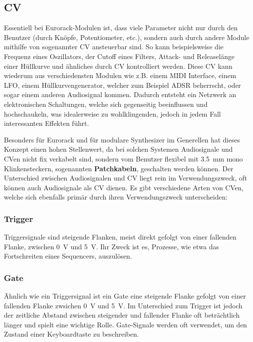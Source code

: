 \subsection{\acf{CV} \label{CV}}
\label{sec:orgf3cb5a9}
Essentiell bei Eurorack-Modulen ist, dass viele Parameter nicht nur durch den Benutzer (durch Knöpfe, Potentiometer, etc.), sondern auch durch andere Module mithilfe von sogenannter \acl{CV} ansteuerbar sind. So kann beispielsweise die Frequenz eines Oszillators, der Cutoff eines Filters, Attack- und Releaselänge einer Hüllkurve und ähnliches durch \acl{CV} kontrolliert werden. Diese \acl{CV} kann wiederum aus verschiedensten Modulen wie z.B. einem MIDI Interface, einem \ac{LFO}, einem Hüllkurvengenerator, welcher zum Beispiel \ac{ADSR} beherrscht, oder sogar einem anderen Audiosignal kommen. Dadurch entsteht ein Netzwerk an elektronischen Schaltungen, welche sich gegenseitig beeinflussen und hochschaukeln, was idealerweise zu wohlklingenden, jedoch in jedem Fall interessanten Effekten führt.

Besonders für Eurorack und für modulare Synthesizer im Generellen hat dieses Konzept einen hohen Stellenwert, da bei solchen Systemen Audiosignale und \acl{CV}en nicht fix verkabelt sind, sondern vom Benutzer flexibel mit \SI{3.5}{\milli\meter} mono Klinkensteckern, sogenannten \textbf{Patchkabeln}, geschalten werden können. Der Unterschied zwischen Audiosignalen und \acl{CV} liegt rein im Verwendungszweck, oft können auch Audiosignale als \acl{CV} dienen. Es gibt verschiedene Arten von \acl{CV}en, welche sich ebenfalls primär durch ihren Verwendungszweck unterscheiden:

\subsubsection{Trigger}
\label{sec:orgbcf64eb}
Triggersignale sind steigende Flanken, meist direkt gefolgt von einer fallenden Flanke, zwischen \SI{0}{\volt} und \SI{5}{\volt}. Ihr Zweck ist es, Prozesse, wie etwa das Fortschreiten eines Sequencers, auszulösen.

\subsubsection{Gate}
\label{sec:org783de1c}
Ähnlich wie ein Triggersignal ist ein Gate eine steigende Flanke gefolgt von einer fallenden Flanke zwsichen \SI{0}{\volt} und \SI{5}{\volt}. Im Unterschied zum Trigger ist jedoch der zeitliche Abstand zwischen steigender und fallender Flanke oft beträchtlich länger und spielt eine wichtige Rolle. Gate-Signale werden oft verwendet, um den Zustand einer Keyboardtaste zu beschreiben.

